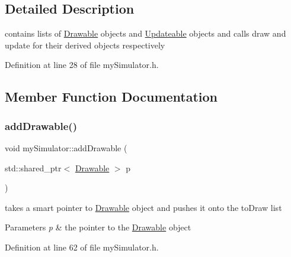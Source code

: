 \subsection{Detailed Description}
contains lists of \mbox{\hyperlink{class_drawable}{Drawable}} objects and \mbox{\hyperlink{class_updateable}{Updateable}} objects and calls draw and update for their derived objects respectively 

Definition at line 28 of file my\+Simulator.\+h.



\subsection{Member Function Documentation}
\mbox{\label{classmy_simulator_ab125b77ddb3b0615354f7140f8db56ba}} 
\subsubsection{\texorpdfstring{addDrawable()}{addDrawable()}}
{\footnotesize\ttfamily void my\+Simulator\+::add\+Drawable (\begin{DoxyParamCaption}\item[{std\+::shared\+\_\+ptr$<$ \mbox{\hyperlink{class_drawable}{Drawable}} $>$}]{p }\end{DoxyParamCaption})\hspace{0.3cm}{\ttfamily [inline]}}



takes a smart pointer to \mbox{\hyperlink{class_drawable}{Drawable}} object and pushes it onto the to\+Draw list 


\begin{DoxyParams}{Parameters}
{\em p} & the pointer to the \mbox{\hyperlink{class_drawable}{Drawable}} object \\
\hline
\end{DoxyParams}


Definition at line 62 of file my\+Simulator.\+h.


\begin{DoxyCode}{0}

\end{DoxyCode}
\mbox{\label{classmy_simulator_a92fb2a63bb35e90f9980be016f75b1bf}} 
